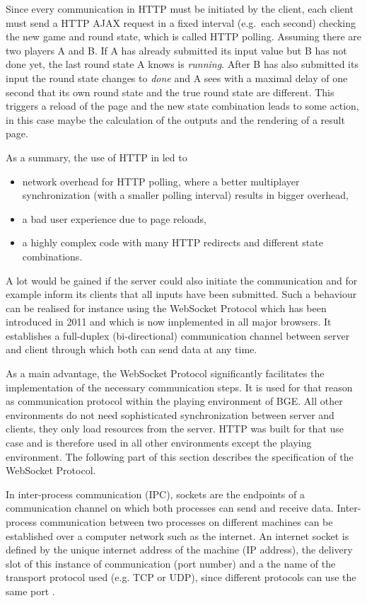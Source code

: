Since every communication in HTTP must be initiated by the client, each client must send a HTTP AJAX request in a fixed interval (e.g.~each second) checking the new game and round state, which is called HTTP polling. Assuming there are two players A and B. If A has already submitted its input value but B has not done yet, the last round state A knows is \textit{running}. After B has also submitted its input the round state changes to \textit{done} and A sees with a maximal delay of one second that its own round state and the true round state are different. This triggers a reload of the page and the new state combination leads to some action, in this case maybe the calculation of the outputs and the rendering of a result page.

As a summary, the use of HTTP in \cite{saltseller} led to
\begin{itemize}
\item network overhead for HTTP polling, where a better multiplayer synchronization (with a smaller polling interval) results in bigger overhead,
\item a bad user experience due to page reloads,
\item a highly complex code with many HTTP redirects and different state combinations.
\end{itemize}

A lot would be gained if the server could also initiate the communication and for example inform its clients that all inputs have been submitted. Such a behaviour can be realised for instance using the WebSocket Protocol \cite{websocket} which has been introduced in 2011 and which is now implemented in all major browsers. It establishes a full-duplex (bi-directional) communication channel between server and client through which both can send data at any time.

As a main advantage, the WebSocket Protocol significantly facilitates the implementation of the necessary communication steps. It is used for that reason as communication protocol within the playing environment of BGE. All other environments do not need sophisticated synchronization between server and clients, they only load resources from the server. HTTP was built for that use case and is therefore used in all other environments except the playing environment. The following part of this section describes the specification of the WebSocket Protocol.

In inter-process communication (IPC), sockets are the endpoints of a communication channel on which both processes can send and receive data. Inter-process communication between two processes on different machines can be established over a computer network such as the internet. An internet socket is defined by the unique internet address of the machine (IP address), the delivery slot of this instance of communication (port number) and a the name of the transport protocol used (e.g. TCP or UDP), since different protocols can use the same port \cite{bsd}.

